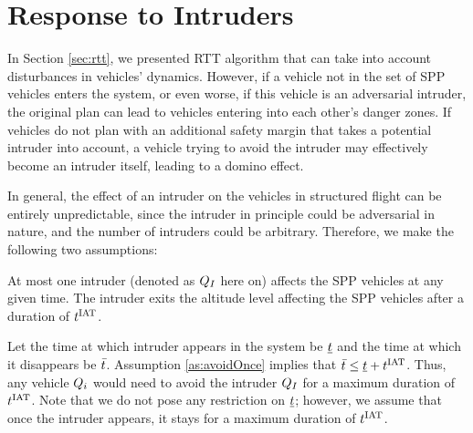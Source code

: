 \section{Response to Intruders \label{sec:intruder}}


In Section \ref{sec:rtt}, we presented RTT algorithm that can take into account disturbances in vehicles' dynamics. However, if a vehicle not in the set of SPP vehicles enters the system, or even worse, if this vehicle is an adversarial intruder, the original plan can lead to vehicles entering into each other's danger zones. If vehicles do not plan with an additional safety margin that takes a potential intruder into account, a vehicle trying to avoid the intruder may effectively become an intruder itself, leading to a domino effect. %

In general, the effect of an intruder on the vehicles in structured flight can be entirely unpredictable, since the intruder in principle could be adversarial in nature, and the number of intruders could be arbitrary. Therefore, we make the following two assumptions: %

\begin{assumption}
\label{as:avoidOnce}
At most one intruder (denoted as $Q_I$ here on) affects the SPP vehicles at any given time. The intruder exits the altitude level affecting the SPP vehicles after a duration of $t^\text{IAT}$. 
\end{assumption}

Let the time at which intruder appears in the system be $\underline{t}$ and the time at which it disappears be $\bar{t}$. Assumption \ref{as:avoidOnce} implies that $\bar{t} \leq \underline{t} + t^\text{IAT}$. Thus, any vehicle $Q_i$ would need to avoid the intruder $Q_{I}$ for a maximum duration of $t^\text{IAT}$. %
Note that we do not pose any restriction on $\underline{t}$; however, we assume that once the intruder appears, it stays for a maximum duration of $t^\text{IAT}$.

